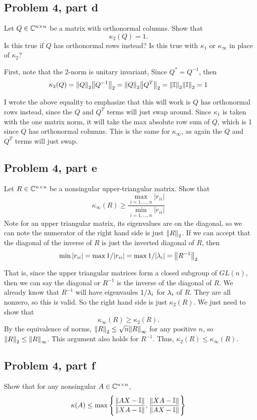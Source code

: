 \newpage
 \subsection{Problem 4, part d}
 Let $Q \in \mathbb{C}^{n\times n}$ be a matrix with orthonormal columns. Show that 
 \[
 \kappa_2(Q) = 1.
 \]
 Is this true if $Q$ has orthonormal rows instead? Is this true with $\kappa_1$ or $\kappa_\infty$ in place of $\kappa_2$?
 \partbreak
 \begin{solution}
     First, note that the 2-norm is unitary invariant, Since $Q^* = Q^{-1}$, then 
     \[
     \kappa_2(Q) = \norm{Q}_2 \norm{Q^{-1}}_2 = \norm{Q}_2\norm{Q^T}_2 = \norm{\mathbb{I}}_2\norm{\mathbb{I}}_2 = 1
     \]

     I wrote the above equality to emphasize that this will work is $Q$ has orthonormal rows instead, since the $Q$ and $Q^T$ terms will just swap around. Since $\kappa_1$ is taken with the one matrix norm, it will take the max absolute row sum of $Q$, which is 1 since $Q$ has orthonormal columns. This is the same for $\kappa_\infty$, as again the $Q$ and $Q^T$ terms will just swap.  
 \end{solution}

 \subsection{Problem 4, part e}
 Let $R \in \mathbb{C}^{n\times n}$ be a nonsingular upper-triangular matrix. Show that
 \[
 \kappa_\infty(R) \geq \frac{\max_{i = 1, ..., n}|r_{ii}|}{\min_{i = 1, ..., n}|r_{ii}|}
 \]
 \partbreak
 Note for an upper triangular matrix, its eigenvalues are on the diagonal, so we can note the numerator of the right hand side is just $\norm{R}_2$. If we can accept that the diagonal of the inverse of $R$ is just the inverted diagonal of $R$, then 
 \[
 \min |r_{ii}| = \max 1/|r_{ii}| = \max 1/|\lambda_i| = \norm{R^{-1}}_2
 \]

 That is, since the upper triangular matrices form a closed subgroup of $GL(n)$, then we can say the diagonal or $R^{-1}$ is the inverse of the diagonal of $R$. We already know that $R^{-1}$ will have eigenvaules $1/\lambda_i$ for $\lambda_i$ of $R$. They are all nonzero, so this is valid. So the right hand side is just $\kappa_2(R)$. We just need to show that 
 \[
 \kappa_\infty(R) \geq \kappa_2(R).
 \]
 By the equivalence of norms, $\norm{R}_2 \leq \sqrt{n}\norm{R}_\infty$ for any positive $n$, so $\norm{R}_2 \leq \norm{R}_\infty$. This argument also holds for $R^{-1}$. Thus, $\kappa_2(R) \leq \kappa_\infty(R)$. 

\newpage
 \subsection{Problem 4, part f}
 Show that for any nonsingular $A \in \mathbb{C}^{n\times n}$, 
 \[
 \kappa(A) \leq \max \Bigg\{ \frac{\norm{AX - \mathbb{I}}}{\norm{XA - \mathbb{I}}}, \frac{\norm{XA - \mathbb{I}}}{\norm{AX - \mathbb{I}}} \Bigg\}
 \]
 \partbreak
 \begin{solution}
     
 \end{solution}

